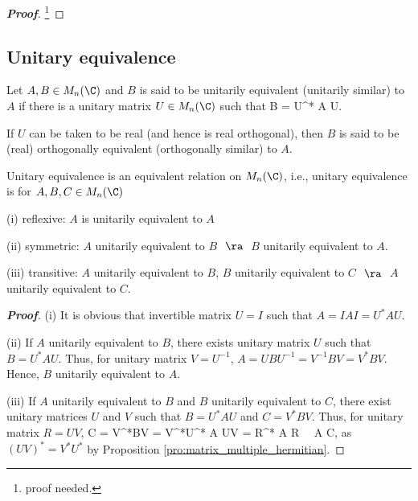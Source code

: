 \begin{proof}[\bf Proof]
\footnote{proof needed.}
\end{proof}

\subsection{Unitary equivalence}

\begin{definition}\label{def:unitarily_equivalent_matrix}
Let $A,B\in M_n(\C)$ and $B$ is said to be unitarily equivalent (unitarily similar) to $A$ if there is a unitary matrix $U\in M_n(\C)$ such that
\be
B = U^* A U.
\ee

If $U$ can be taken to be real (and hence is real orthogonal), then $B$ is said to be (real) orthogonally equivalent (orthogonally similar) to $A$.
\end{definition}



\begin{proposition}\label{pro:unitary_equivalence_implies_equivalent_matrices}
Unitary equivalence is an equivalent relation on $M_n(\C)$, i.e., unitary equivalence is for $A,B,C\in M_n(\C)$
\ben
\item [(i)] reflexive: $A$ is unitarily equivalent to $A$
\item [(ii)] symmetric: $A$ unitarily equivalent to $B$ $\ \ra\ $ $B$ unitarily equivalent to $A$.
\item [(iii)] transitive: $A$ unitarily equivalent to $B$, $B$ unitarily equivalent to $C$ $\ \ra\ $ $A$ unitarily equivalent to $C$.
\een
\end{proposition}


\begin{proof}[\bf Proof]%
\ben
\item [(i)] It is obvious that invertible matrix $U = I$ such that $A = IAI = U^*AU$.
\item [(ii)] If $A$ unitarily equivalent to $B$, there exists unitary matrix $U$ such that $B = U^*AU$. Thus, for unitary matrix $V = U^{-1}$, $A = U B U^{-1} = V^{-1}BV = V^*BV $. Hence, $B$
    unitarily equivalent to $A$.

\item [(iii)] If $A$ unitarily equivalent to $B$ and $B$ unitarily equivalent to $C$, there exist unitary matrices $U$ and $V$ such that $B = U^*AU$ and $C = V^*BV$. Thus, for unitary matrix $R = UV$,
\be
C = V^*BV = V^*U^* A UV = R^* A R \ \ra \ A  C,
\ee
as $(UV)^* = V^*U^*$ by Proposition \ref{pro:matrix_multiple_hermitian}.
\een
\end{proof}

